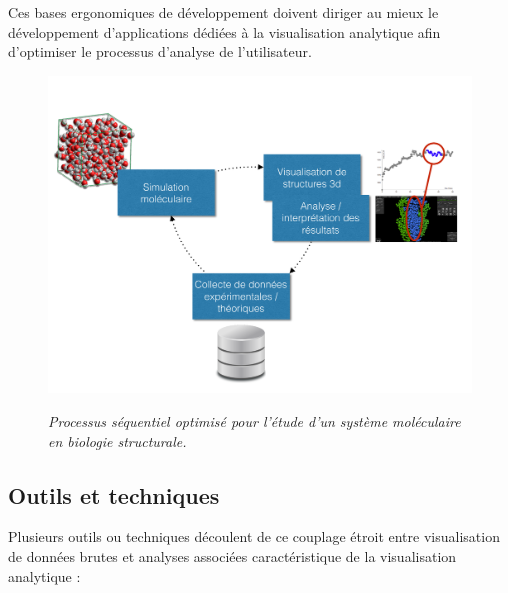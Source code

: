 Ces bases ergonomiques de développement doivent diriger au mieux le développement d'applications dédiées à la visualisation analytique afin d'optimiser le processus d'analyse de l'utilisateur.

\begin{figure}
  \centering
  {\includegraphics[width=.75\linewidth]{./figures/ch2/ch2_structural_biology_optim.pdf}}
    \caption{{\it Processus séquentiel optimisé pour l'étude d'un système moléculaire en biologie structurale.}}
  \label{Fig:schema_seq_bio_optim}
  \hspace{0.3cm}
\end{figure}


\subsection{Outils et techniques} \label{visu_ana_tools}

Plusieurs outils ou techniques découlent de ce couplage étroit entre visualisation de données brutes et analyses associées caractéristique de la visualisation analytique \cite{cockburn2008review}:

